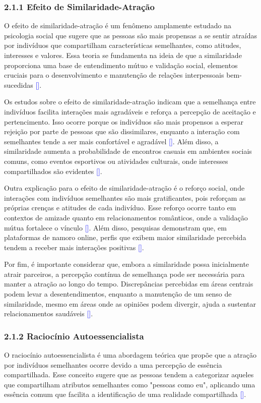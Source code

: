\subsubsection{2.1.1 Efeito de Similaridade-Atração}
O efeito de similaridade-atração é um fenômeno amplamente estudado na psicologia social que sugere que as pessoas são mais propensas a se sentir atraídas por indivíduos que compartilham características semelhantes, como atitudes, interesses e valores. Essa teoria se fundamenta na ideia de que a similaridade proporciona uma base de entendimento mútuo e validação social, elementos cruciais para o desenvolvimento e manutenção de relações interpessoais bem-sucedidas \textcolor{blue}{[\cite{Berscheid1998}]}.

Os estudos sobre o efeito de similaridade-atração indicam que a semelhança entre indivíduos facilita interações mais agradáveis e reforça a percepção de aceitação e pertencimento. Isso ocorre porque os indivíduos são mais propensos a esperar rejeição por parte de pessoas que são dissimilares, enquanto a interação com semelhantes tende a ser mais confortável e agradável \textcolor{blue}{[\cite{Montoya2008}]}. Além disso, a similaridade aumenta a probabilidade de encontros casuais em ambientes sociais comuns, como eventos esportivos ou atividades culturais, onde interesses compartilhados são evidentes \textcolor{blue}{[\cite{Newcomb1961}]}.

Outra explicação para o efeito de similaridade-atração é o reforço social, onde interações com indivíduos semelhantes são mais gratificantes, pois reforçam as próprias crenças e atitudes de cada indivíduo. Esse reforço ocorre tanto em contextos de amizade quanto em relacionamentos românticos, onde a validação mútua fortalece o vínculo \textcolor{blue}{[\cite{Byrne1971}]}. Além disso, pesquisas demonstram que, em plataformas de namoro online, perfis que exibem maior similaridade percebida tendem a receber mais interações positivas \textcolor{blue}{[\cite{Montoya2008}]}.

Por fim, é importante considerar que, embora a similaridade possa inicialmente atrair parceiros, a percepção contínua de semelhança pode ser necessária para manter a atração ao longo do tempo. Discrepâncias percebidas em áreas centrais podem levar a desentendimentos, enquanto a manutenção de um senso de similaridade, mesmo em áreas onde as opiniões podem divergir, ajuda a sustentar relacionamentos saudáveis \textcolor{blue}{[\cite{Montoya2008}]}.

\subsubsection{2.1.2 Raciocínio Autoessencialista}
O raciocínio autoessencialista é uma abordagem teórica que propõe que a atração por indivíduos semelhantes ocorre devido a uma percepção de essência compartilhada. Esse conceito sugere que as pessoas tendem a categorizar aqueles que compartilham atributos semelhantes como "pessoas como eu", aplicando uma essência comum que facilita a identificação de uma realidade compartilhada \textcolor{blue}{[\cite{Chu2023}]}.

